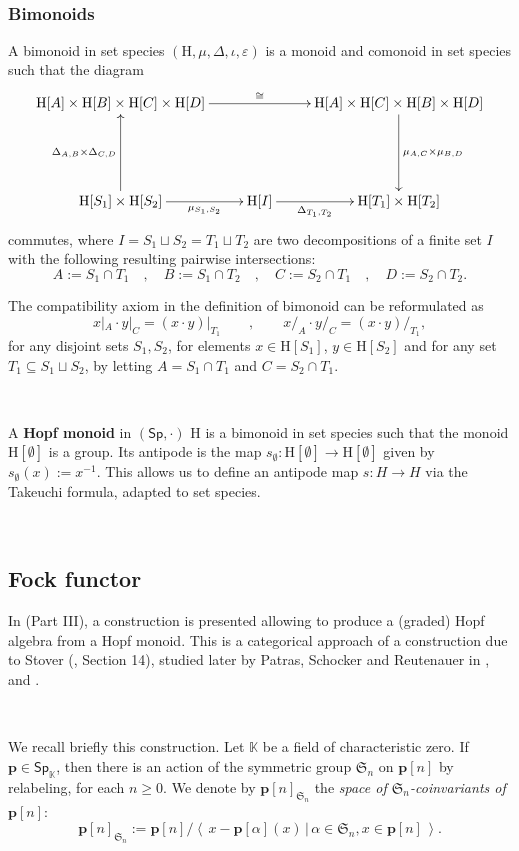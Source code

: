 \documentclass[12pt, reqno]{amsart}
\theoremstyle{definition}
\newcommand{\Ss}{\mathsf{Sp}} %
\newcommand{\Ssk}{\mathsf{Sp}_\Kb} %
\newcommand{\Kb}{\mathbb{K}}
\newcommand{\rH}{\mathrm{H}}
\newcommand{\tp}{\mathbf{p}}
\begin{document}
\

\subsubsection{Bimonoids}
A bimonoid in set species $(\rH, \mu, \Delta, \iota, \varepsilon)$ is a monoid and comonoid in set species such that the diagram
\[\xymatrix{
\rH[A] \times \rH[B] \times\rH[C] \times \rH[D] \ar[rr]^-{\cong} && \rH[A] \times \rH[C] \times \rH[B] \times \rH[D] \ar[dd]^-{\mu_{A,C}\times\mu_{B,D}}\\
&&\\
\rH[S_1]\times \rH[S_2]\ar[uu]^-{\Delta_{A,B}\times \Delta_{C,D}} \ar[r]_-{\mu_{S_1, S_2}} & \rH[I] \ar[r]_-{\Delta_{T_1, T_2}} & \rH[T_1]\times \rH[T_2]
}\]
commutes, where $I=S_1\sqcup S_2=T_1 \sqcup T_2$ are two decompositions of a finite set $I$ with the following resulting pairwise intersections:
\[A:=S_1\cap T_1 \quad , \quad B:=S_1 \cap T_2 \quad , \quad C:=S_2 \cap T_1 \quad , \quad D:=S_2 \cap T_2.\]

The compatibility axiom in the definition of bimonoid can be reformulated as
\[x|_A \cdot y|_C= (x\cdot y)|_{T_1} \qquad , \qquad x/_A \cdot y/_C=(x \cdot y)/_{T_1},\]
for any disjoint sets $S_1, S_2$, for elements $x \in \rH[S_1]$, $y\in \rH[S_2]$ and for any set $T_1\subseteq S_1 \sqcup S_2$, by letting $A= S_1 \cap T_1$ and $C= S_2\cap T_1$.

\

A {\bf Hopf monoid} in $(\Ss, \cdot)$ $\rH$ is a bimonoid in set species such that the monoid $\rH[\emptyset]$ is a group. Its antipode is the map $s_\emptyset: \rH[\emptyset]\to \rH[\emptyset]$ given by $s_\emptyset(x):=x^{-1}$.
This allows us to define an antipode map $s: H\to H$ via the Takeuchi formula, adapted to set species.


\

\subsection{Fock functor}
In \cite{AM2010} (Part III), a construction is presented allowing to produce a (graded) Hopf algebra from a Hopf monoid. This is a categorical approach of a construction due to Stover (\cite{Stover}, Section 14), studied later by Patras, Schocker and Reutenauer in \cite{PR2004}, \cite{PS2006} and \cite{PS2008}.

\

We recall briefly this construction. Let $\mathbb{K}$ be a field of characteristic zero. If $\tp \in \Ssk$, then there is an action of the symmetric group $\mathfrak{S}_n$ on $\tp[n]$ by relabeling, for each $n \geq 0$. We denote by $\tp[n]_{\mathfrak{S}_n}$ the \emph{space of $\mathfrak{S}_n$-coinvariants of $\tp[n]$}:
\begin{equation}
  \tp[n]_{\mathfrak{S}_n}:=\tp[n]/\left\langle \, x- \tp[\alpha](x) \, | \, \alpha \in \mathfrak{S}_n, x\in \tp[n] \,\right\rangle.
\end{equation}
\end{document}
